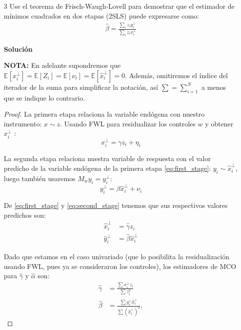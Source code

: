 \documentclass[a4paper, answers, addpoints, 11pt]{exam}
\newenvironment{solucion}{%
  \begin{mdframed}[
    backgroundcolor=blue!5,    %
    linecolor=blue!50,          %
    linewidth=2pt,              %
    leftmargin=10pt,            %
    rightmargin=8pt,           %
    topline=true,              %
    bottomline=true,            %
    roundcorner=10pt,           %
    innerleftmargin=10pt,       %
    innerrightmargin=10pt,      %
    innerbottommargin=10pt,     %
    innertopmargin=10pt         %
  ]%
  \begin{tcolorbox}[colframe=blue!50!black, colback=blue!50, coltitle=white, sharp corners=all, boxrule=1mm, width=\textwidth, halign=left, valign=center, top=0mm, bottom=0mm, left=0mm, right=0mm] \textbf{Solución} \end{tcolorbox} }{\end{mdframed}}
\begin{document}
\begin{enumerate}
    \item[3] Use el teorema de Frisch-Waugh-Lovell para demostrar que el estimador de mínimos cuadrados en dos etapas (2SLS) puede expresarse como:
    \begin{align}
    \hat{\beta} = \frac{\sum_{i} z_i y^{\perp}_{i}}{\sum_{i} z_i x^{\perp}_{i}}
    \end{align}

    \begin{solucion}
    \textbf{NOTA:} En adelante supondremos que $\mathbb{E}[x_i^{\perp}] = \mathbb{E}[Z_i] = \mathbb{E}[\nu_i] = \mathbb{E}[\hat{x}_i^{\perp}] = 0$. Además, omitiremos el índice del iterador de la suma para simplificar la notación, así $\sum=\sum_{i=1}^N$ a menos que se indique lo contrario.
    \begin{proof}
        
    
    La primera etapa relaciona la variable endógena con nuestro instrumento: $x \sim z$. Usando FWL para residualizar los controles $w$ y obtener $x_i^\perp$ :
\begin{equation}
    x_i^{\perp} = \gamma z_i + \eta_i \label{eq:first_stage}
\end{equation}

La segunda etapa relaciona nuestra variable de respuesta con el valor predicho de la variable endógena de la primera etapa \ref{eq:first_stage}: $y_i \sim \hat{x}_i^\perp$, luego también usaremos $M_w y_i = y_i^{\perp}$:
\begin{equation}
    y_i^{\perp} = \beta \hat{x}_i^{\perp} + \nu_i \label{eq:second_stage}
\end{equation}

De \ref{eq:first_stage} y \ref{eq:second_stage} tenemos que sus respectivos valores predichos son:
\begin{align}
    \hat{x}_i^{\perp} &= \hat{\gamma} z_i \label{eq:fit_fs} \\
    \hat{y}_i^{\perp} &= \hat{\beta} \hat{x}_i^{\perp} \label{eq:fit_ss}
\end{align}

Dado que estamos en el caso univariado (que lo posibilita la residualización usando FWL, pues ya se consideraron los controles), los estimadores de MCO para $\hat{\gamma}$ y $\hat{\alpha}$ son:
\begin{align}
    \hat{\gamma} &= \frac{\sum x_i^{\perp} z_i}{\sum z_i^2} \label{eq:gamma_hat} \\
    \hat{\beta} &= \frac{\sum y_i^{\perp} \hat{x}_i^{\perp}}{\sum (\hat{x}_i^{\perp})^2} \label{eq:beta_hat},
\end{align}


\end{proof}
\end{solucion}
\end{enumerate}
\end{document}
